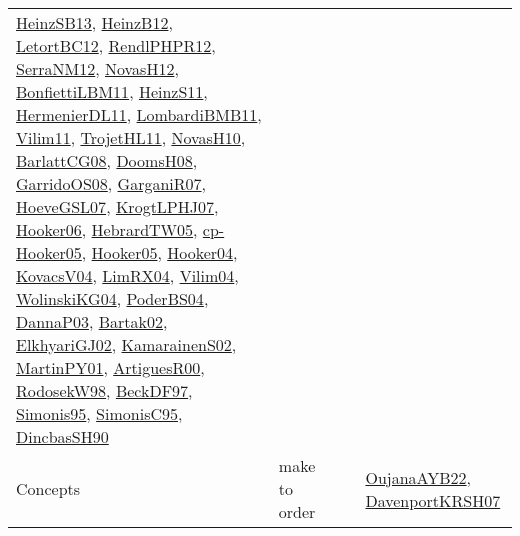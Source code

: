 {\begin{longtable}{lp{3cm}>{\raggedright}p{6cm}>{\raggedright}p{6cm}p{8cm}}
\href{articles/HeinzSB13.pdf}{HeinzSB13}\cite{HeinzSB13}, \href{papers/HeinzB12.pdf}{HeinzB12}\cite{HeinzB12}, \href{papers/LetortBC12.pdf}{LetortBC12}\cite{LetortBC12}, \href{papers/RendlPHPR12.pdf}{RendlPHPR12}\cite{RendlPHPR12}, \href{papers/SerraNM12.pdf}{SerraNM12}\cite{SerraNM12}, \href{articles/NovasH12.pdf}{NovasH12}\cite{NovasH12}, \href{papers/BonfiettiLBM11.pdf}{BonfiettiLBM11}\cite{BonfiettiLBM11}, \href{papers/HeinzS11.pdf}{HeinzS11}\cite{HeinzS11}, \href{papers/HermenierDL11.pdf}{HermenierDL11}\cite{HermenierDL11}, \href{papers/LombardiBMB11.pdf}{LombardiBMB11}\cite{LombardiBMB11}, \href{papers/Vilim11.pdf}{Vilim11}\cite{Vilim11}, \href{articles/TrojetHL11.pdf}{TrojetHL11}\cite{TrojetHL11}, \href{articles/NovasH10.pdf}{NovasH10}\cite{NovasH10}, \href{papers/BarlattCG08.pdf}{BarlattCG08}\cite{BarlattCG08}, \href{papers/DoomsH08.pdf}{DoomsH08}\cite{DoomsH08}, \href{articles/GarridoOS08.pdf}{GarridoOS08}\cite{GarridoOS08}, \href{papers/GarganiR07.pdf}{GarganiR07}\cite{GarganiR07}, \href{papers/HoeveGSL07.pdf}{HoeveGSL07}\cite{HoeveGSL07}, \href{papers/KrogtLPHJ07.pdf}{KrogtLPHJ07}\cite{KrogtLPHJ07}, \href{articles/Hooker06.pdf}{Hooker06}\cite{Hooker06}, \href{papers/HebrardTW05.pdf}{HebrardTW05}\cite{HebrardTW05}, \href{papers/cp-Hooker05.pdf}{cp-Hooker05}\cite{cp-Hooker05}, \href{articles/Hooker05.pdf}{Hooker05}\cite{Hooker05}, \href{papers/Hooker04.pdf}{Hooker04}\cite{Hooker04}, \href{papers/KovacsV04.pdf}{KovacsV04}\cite{KovacsV04}, \href{papers/LimRX04.pdf}{LimRX04}\cite{LimRX04}, \href{papers/Vilim04.pdf}{Vilim04}\cite{Vilim04}, \href{papers/WolinskiKG04.pdf}{WolinskiKG04}\cite{WolinskiKG04}, \href{articles/PoderBS04.pdf}{PoderBS04}\cite{PoderBS04}, \href{papers/DannaP03.pdf}{DannaP03}\cite{DannaP03}, \href{papers/Bartak02.pdf}{Bartak02}\cite{Bartak02}, \href{papers/ElkhyariGJ02.pdf}{ElkhyariGJ02}\cite{ElkhyariGJ02}, \href{papers/KamarainenS02.pdf}{KamarainenS02}\cite{KamarainenS02}, \href{articles/MartinPY01.pdf}{MartinPY01}\cite{MartinPY01}, \href{articles/ArtiguesR00.pdf}{ArtiguesR00}\cite{ArtiguesR00}, \href{papers/RodosekW98.pdf}{RodosekW98}\cite{RodosekW98}, \href{papers/BeckDF97.pdf}{BeckDF97}\cite{BeckDF97}, \href{papers/Simonis95.pdf}{Simonis95}\cite{Simonis95}, \href{papers/SimonisC95.pdf}{SimonisC95}\cite{SimonisC95}, \href{articles/DincbasSH90.pdf}{DincbasSH90}\cite{DincbasSH90}\\
Concepts & make to order &  &  & \href{papers/OujanaAYB22.pdf}{OujanaAYB22}\cite{OujanaAYB22}, \href{papers/DavenportKRSH07.pdf}{DavenportKRSH07}\cite{DavenportKRSH07}\\

\end{longtable}}
